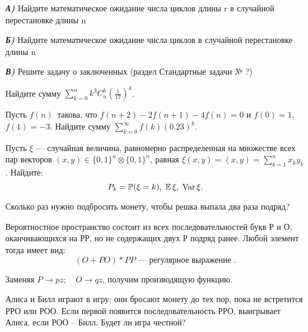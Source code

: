 \begin{problem}

\textbf{\textit{А)}} Найдите математическое ожидание числа циклов длины r в 
случайной перестановке длины n

\textbf{\textit{Б)}} Найдите математическое ожидание числа циклов в 
случайной перестановке длины n 

\textbf{\textit{В)}} Решите задачу о заключенных (раздел Стандартные задачи № ?)

\end{problem}

\begin{problem}
Найдите сумму $\sum\limits_{k=0}^n k^3 C_n^k \left(\frac{1}{17}\right)^k$.
\end{problem}

\begin{problem}
Пусть $f(n)$~такова, что $ f(n+2) - 2f(n+1) - 4f(n) = 0 $ и $ f(0) = 1 $, $ f(1) = -3 $. Найдите сумму $ \sum\limits_{k=0}^{\infty} f(k) (0.23)^k $.
\end{problem}

\begin{problem}
Пусть $\xi$ --- случайная величина, равномерно распределенная на множестве всех пар векторов 
$(x,y)\in \{ 0,1\}^n\otimes \{ 0,1\}^n$, равная $\xi(x,y)=(x,y)=\sum\limits_{k=1}^{n} x_k y_k$. Найдите: 
$$
P_k={\mathbb P}(\xi=k), \; {\mathbb E}\,\xi, \; \mathop{\mathrm{Var}}\nolimits \xi . 
$$
\end{problem}

\begin{problem}
Сколько раз нужно подбросить монету, чтобы решка выпала два раза подряд?
\end{problem}

\begin{ordre}
Вероятностное пространство состоит из всех 
последовательностей букв Р и О, оканчивающихся на РР, но не содержащих двух 
Р подряд ранее. Любой элемент тогда имеет вид:
$$
(O+PO)*PP \text{ --- регулярное выражение }.
$$

Заменяя ${P}\to pz;\quad {O}\to qz$, получим производящую функцию.
\end{ordre}


\begin{problem}
Алиса и Билл играют в игру: они 
бросают монету до тех пор, пока не встретится РРО или РОО. Если первой 
появится последовательность РРО, выигрывает Алиса, если РОО -- Билл. Будет 
ли игра честной?
\end{problem}

